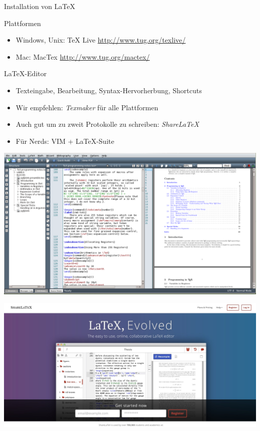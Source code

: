 \documentclass[hyperref={pdfpagelabels=false}]{beamer}
\begin{document}
\begin{frame}{Installation von \LaTeX{}}
    \begin{block}{Plattformen}
        \begin{itemize}
            \item Windows, Unix: TeX Live \url{http://www.tug.org/texlive/}
            \item Mac: MacTex \url{http://www.tug.org/mactex/}
        \end{itemize}
    \end{block}
    \begin{block}{\LaTeX{}-Editor}
        \begin{itemize}
            \item Texteingabe, Bearbeitung, Syntax-Hervorherbung, Shortcuts
            \item Wir empfehlen: \textit{Texmaker} für alle Plattformen
            \item Auch gut um zu zweit Protokolle zu schreiben: \textit{ShareLaTeX}
            \item Für Nerds: VIM + LaTeX-Suite
        \end{itemize}
    \end{block}
\end{frame}
\begin{frame}[plain]
    \includegraphics[width=\textwidth]{pics/texmaker.png}
\end{frame}
\begin{frame}[plain]
    \includegraphics[width=\textwidth]{pics/sharelatex.pdf}
\end{frame}
\end{document}
